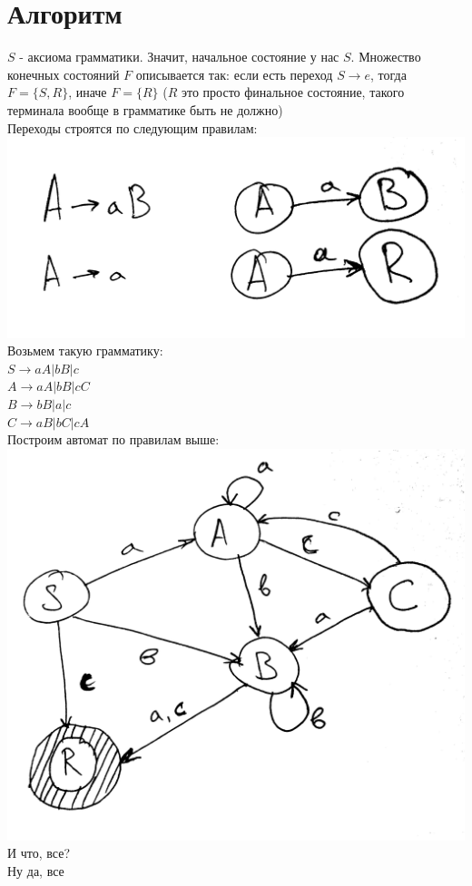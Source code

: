 \documentclass[14pt]{extreport}
\begin{document}
	\section{Алгоритм}
	$S$ - аксиома грамматики. Значит, начальное состояние у нас $S$. Множество конечных
	состояний $F$ описывается так: если есть переход $S \to e$, тогда $F=\{S,R\}$,
	иначе $F=\{R\}$ ($R$ это просто финальное состояние, такого терминала вообще в
	грамматике быть не должно)\\
	Переходы строятся по следующим правилам:\\
	\includegraphics[scale=0.12]{data/pic6_1.png}\\
	Возьмем такую грамматику:\\
	$S \to aA | bB | c$\\
	$A \to aA | bB | cC $\\
	$B \to bB | a | c $\\
	$C \to aB | bC | cA $\\
	\newpage
	Построим автомат по правилам выше:\\
	\includegraphics[scale=0.12]{data/pic6_2.png}\\
	И что, все?\\
	Ну да, все\\
\end{document}
